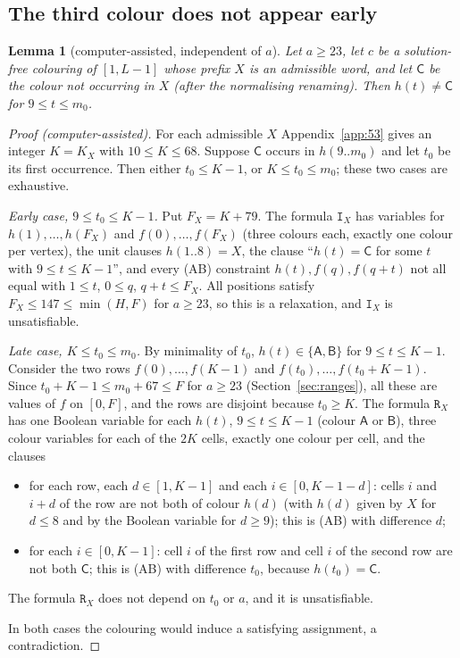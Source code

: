 \documentclass[11pt]{amsart}
\newtheorem{lemma}[theorem]{Lemma}
\theoremstyle{definition}
\theoremstyle{remark}
\newcommand{\cA}{\mathsf{A}}\newcommand{\cB}{\mathsf{B}}\newcommand{\cC}{\mathsf{C}}
\begin{document}
\subsection{The third colour does not appear early}
\begin{lemma}[computer-assisted, independent of $a$]\label{lem:r76}
Let $a\ge23$, let $c$ be a solution-free colouring of $[1,L-1]$ whose prefix $X$ is an admissible word, and let
$\cC$ be the colour not occurring in $X$ (after the normalising renaming). Then $h(t)\ne\cC$ for $9\le t\le m_0$.
\end{lemma}
\begin{proof}[Proof (computer-assisted)]
For each admissible $X$ Appendix~\ref{app:53} gives an integer $K=K_X$ with $10\le K\le 68$. Suppose $\cC$ occurs in
$h(9..m_0)$ and let $t_0$ be its first occurrence. Then either $t_0\le K-1$, or $K\le t_0\le m_0$; these two cases
are exhaustive.

\emph{Early case, $9\le t_0\le K-1$.} Put $F_X=K+79$. The formula $\mathtt{I}_{X}$ has variables for $h(1),\dots,
h(F_X)$ and $f(0),\dots,f(F_X)$ (three colours each, exactly one colour per vertex), the unit clauses $h(1..8)=X$,
the clause ``$h(t)=\cC$ for some $t$ with $9\le t\le K-1$'', and every (AB) constraint
$h(t),f(q),f(q+t)$ not all equal with $1\le t$, $0\le q$, $q+t\le F_X$. All positions satisfy $F_X\le147\le\min(H,F)$
for $a\ge23$, so this is a relaxation, and $\mathtt I_X$ is unsatisfiable.

\emph{Late case, $K\le t_0\le m_0$.} By minimality of $t_0$, $h(t)\in\{\cA,\cB\}$ for $9\le t\le K-1$. Consider the
two rows $f(0),\dots,f(K-1)$ and $f(t_0),\dots,f(t_0+K-1)$. Since $t_0+K-1\le m_0+67\le F$ for $a\ge23$
(Section~\ref{sec:ranges}), all these are values of $f$ on $[0,F]$, and the rows are disjoint because $t_0\ge K$.
The formula $\mathtt R_X$ has one Boolean variable for each $h(t)$, $9\le t\le K-1$ (colour $\cA$ or $\cB$), three
colour variables for each of the $2K$ cells, exactly one colour per cell, and the clauses
\begin{itemize}
\item for each row, each $d\in[1,K-1]$ and each $i\in[0,K-1-d]$: cells $i$ and $i+d$ of the row are not both of
colour $h(d)$ (with $h(d)$ given by $X$ for $d\le8$ and by the Boolean variable for $d\ge9$); this is (AB) with
difference $d$;
\item for each $i\in[0,K-1]$: cell $i$ of the first row and cell $i$ of the second row are not both $\cC$; this is
(AB) with difference $t_0$, because $h(t_0)=\cC$.
\end{itemize}
The formula $\mathtt R_X$ does not depend on $t_0$ or $a$, and it is unsatisfiable.

In both cases the colouring would induce a satisfying assignment, a contradiction.
\end{proof}
\end{document}
